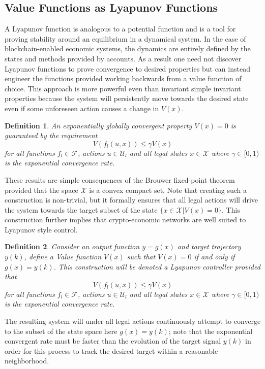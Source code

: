 \documentclass[letterpaper, 10 pt, conference]{ieeeconf}  %
\newtheorem{definition}{Definition}
\begin{document}
\subsection{Value Functions as Lyapunov Functions}

A Lyapunov function is analogous to a potential function and is a tool for proving stability around an equilibrium in a dynamical system. In the case of blockchain-enabled economic systems, the dynamics are entirely defined by the states and methods provided by accounts. As a result one need not discover Lyapunov functions to prove convergence to desired properties but can instead engineer the functions provided working backwards from a value function of choice. This approach is more powerful even than invariant simple invariant properties because the system will persistently move towards the desired state even if some unforeseen action causes a change in $V(x)$. 
\begin{definition}
An exponentially globally convergent property $V(x)=0$ is guaranteed by the requirement 
\[
V(f_l(u,x)) \le \gamma V(x)
\]
for all functions $f_l\in \mathcal{F}$, actions $u\in \mathcal{U}_l$ and all legal states $x\in\mathcal{X}$ where $\gamma\in[0,1)$ is the exponential convergence rate. 
\end{definition}
These results are simple consequences of the Brouwer fixed-point theorem \cite{smart1980fixed} provided that the space $\mathcal{X}$ is a convex compact set. Note that creating such a construction is non-trivial, but it formally ensures that all legal actions will drive the system towards the target subset of the state $\{x\in \mathcal{X} | V(x)=0\}$.  This construction further implies that crypto-economic networks are well suited to Lyapunov style control.

\begin{definition}\label{control}
Consider an output function $y = g(x)$ and target trajectory $y(k)$, define a Value function $V(x)$ such that $V(x)= 0$ if and only if $g(x) = y(k)$. This construction will be denoted a Lyapunov controller provided that 
\[
V(f_l(u,x)) \le \gamma V(x)
\]
for all functions $f_l\in \mathcal{F}$, actions $u\in \mathcal{U}_l$ and all legal states $x\in\mathcal{X}$ where $\gamma\in[0,1)$ is the exponential convergence rate. 
\end{definition}
The resulting system will under all legal actions continuously attempt to converge to the subset of the state space here $g(x) = y(k)$; note that the exponential convergent rate must be faster than the evolution of the target signal $y(k)$ in order for this process to track the desired target within a reasonable neighborhood.
\end{document}
